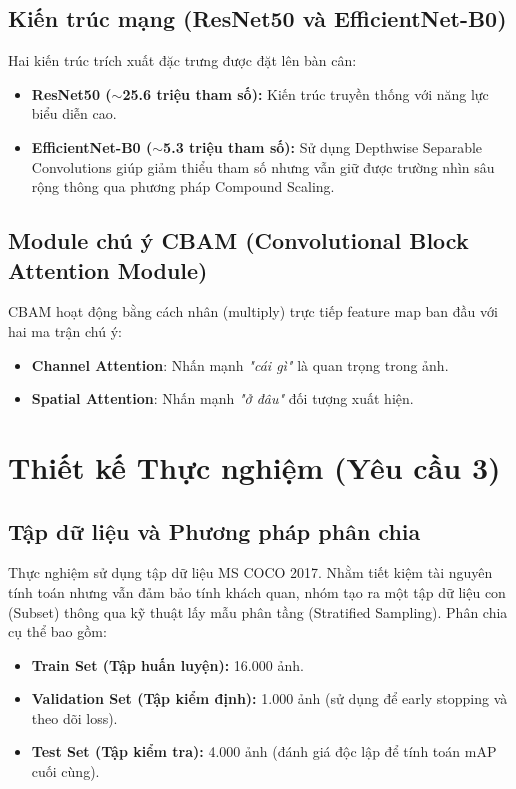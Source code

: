 \documentclass{article}
\begin{document}
\subsection{Kiến trúc mạng (ResNet50 và EfficientNet-B0)}
Hai kiến trúc trích xuất đặc trưng được đặt lên bàn cân:
\begin{itemize}
    \item \textbf{ResNet50 ($\sim$25.6 triệu tham số):} Kiến trúc truyền thống với năng lực biểu diễn cao.
    \item \textbf{EfficientNet-B0 ($\sim$5.3 triệu tham số):} Sử dụng Depthwise Separable Convolutions giúp giảm thiểu tham số nhưng vẫn giữ được trường nhìn sâu rộng thông qua phương pháp Compound Scaling.
\end{itemize}

\subsection{Module chú ý CBAM (Convolutional Block Attention Module)}
CBAM hoạt động bằng cách nhân (multiply) trực tiếp feature map ban đầu với hai ma trận chú ý:
\begin{itemize}
    \item \textbf{Channel Attention}: Nhấn mạnh \textit{"cái gì"} là quan trọng trong ảnh.
    \item \textbf{Spatial Attention}: Nhấn mạnh \textit{"ở đâu"} đối tượng xuất hiện.
\end{itemize}

\section{Thiết kế Thực nghiệm (Yêu cầu 3)}

\subsection{Tập dữ liệu và Phương pháp phân chia}
Thực nghiệm sử dụng tập dữ liệu MS COCO 2017. Nhằm tiết kiệm tài nguyên tính toán nhưng vẫn đảm bảo tính khách quan, nhóm tạo ra một tập dữ liệu con (Subset) thông qua kỹ thuật lấy mẫu phân tầng (Stratified Sampling). Phân chia cụ thể bao gồm:
\begin{itemize}
    \item \textbf{Train Set (Tập huấn luyện):} 16.000 ảnh.
    \item \textbf{Validation Set (Tập kiểm định):} 1.000 ảnh (sử dụng để early stopping và theo dõi loss).
    \item \textbf{Test Set (Tập kiểm tra):} 4.000 ảnh (đánh giá độc lập để tính toán mAP cuối cùng).
\end{itemize}
\end{document}
